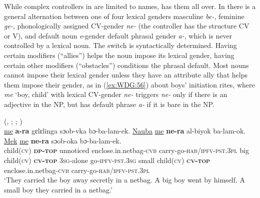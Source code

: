 \documentclass[output=collectionpaper]{langsci/langscibook}
\begin{document}
While complex controllers in  are limited to names,  has them all over. In  there is a general alternation between one of four lexical genders \textendash{} masculine \textit{be-}, feminine \textit{ge-}, phonologically assigned CV-gender \textit{ne-} (the controller has the structure CV or V), and default noun \textit{e}-gender \textendash{} default phrasal gender \textit{a-}, which is never controlled by a lexical noun. The switch is syntactically determined. Having certain modifiers (``allies'') helps the noun impose its lexical gender, having certain other modifiers (``obstacles'') conditions the phrasal default. Most nouns cannot impose their lexical gender unless they have an attribute ally that helps them impose their gender, as in (\ref{ex:WDG:56}) about boys' initiation rites, where \textit{me} `boy, child' with lexical CV-gender \textit{ne-} triggers \textit{ne-} only if there is an adjective in the NP, but has default phrase \textit{a-} if it is bare in the NP.

\ea\label{ex:WDG:56}
 (, ; \citealt{Binzellnd}; \citealt[71]{Waelchli2018})\\
\gll \uline{me}	\textbf{a-ra}	gɛlɛlinga	sɔob-vka	bɔ-ba-lam-ek. \uline{Nauba}	\uline{me}	\textbf{ne-ra}	al-biyok	ba-lam-ok.	\uline{Mek}	\uline{me}	\textbf{ne-ra}	sɔob-oka	bɔ-ba-lam-ek.\\
child(\textsc{cv})	\textbf{\textsc{dp-top}}	unnoticed	enclose.in.netbag-\textsc{cvb}	carry-go-\textsc{hab/ipfv-pst.3pl} big	child(\textsc{cv})	\textbf{\textsc{cv-top}}	\textsc{3sg}-alone	go-\textsc{ipfv-pst.3sg} small	child(\textsc{cv})	\textbf{\textsc{cv-top}}	enclose.in.netbag-\textsc{cvb}	carry-go-\textsc{hab/ipfv-pst.3pl}\\
\glt `They carried the boy away secretly in a netbag. A big boy went by himself. A small boy they carried in a netbag.'\\
\z
\end{document}
